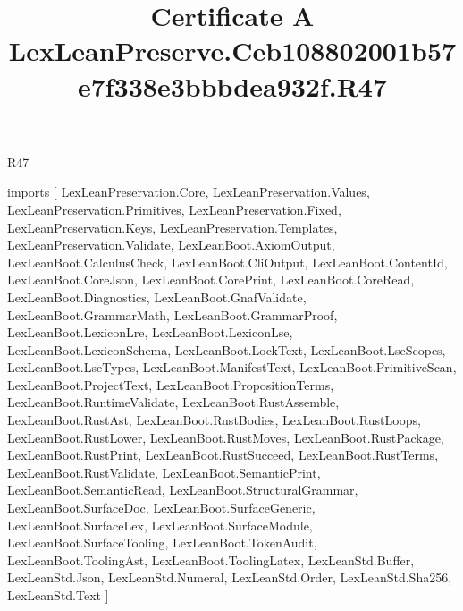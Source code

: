 \begin{lexlean}{R47}
\title{Certificate A LexLeanPreserve.Ceb108802001b57e7f338e3bbbdea932f.R47}
\begin{coremodule}
imports [
  LexLeanPreservation.Core,
  LexLeanPreservation.Values,
  LexLeanPreservation.Primitives,
  LexLeanPreservation.Fixed,
  LexLeanPreservation.Keys,
  LexLeanPreservation.Templates,
  LexLeanPreservation.Validate,
  LexLeanBoot.AxiomOutput,
  LexLeanBoot.CalculusCheck,
  LexLeanBoot.CliOutput,
  LexLeanBoot.ContentId,
  LexLeanBoot.CoreJson,
  LexLeanBoot.CorePrint,
  LexLeanBoot.CoreRead,
  LexLeanBoot.Diagnostics,
  LexLeanBoot.GnafValidate,
  LexLeanBoot.GrammarMath,
  LexLeanBoot.GrammarProof,
  LexLeanBoot.LexiconLre,
  LexLeanBoot.LexiconLse,
  LexLeanBoot.LexiconSchema,
  LexLeanBoot.LockText,
  LexLeanBoot.LseScopes,
  LexLeanBoot.LseTypes,
  LexLeanBoot.ManifestText,
  LexLeanBoot.PrimitiveScan,
  LexLeanBoot.ProjectText,
  LexLeanBoot.PropositionTerms,
  LexLeanBoot.RuntimeValidate,
  LexLeanBoot.RustAssemble,
  LexLeanBoot.RustAst,
  LexLeanBoot.RustBodies,
  LexLeanBoot.RustLoops,
  LexLeanBoot.RustLower,
  LexLeanBoot.RustMoves,
  LexLeanBoot.RustPackage,
  LexLeanBoot.RustPrint,
  LexLeanBoot.RustSucceed,
  LexLeanBoot.RustTerms,
  LexLeanBoot.RustValidate,
  LexLeanBoot.SemanticPrint,
  LexLeanBoot.SemanticRead,
  LexLeanBoot.StructuralGrammar,
  LexLeanBoot.SurfaceDoc,
  LexLeanBoot.SurfaceGeneric,
  LexLeanBoot.SurfaceLex,
  LexLeanBoot.SurfaceModule,
  LexLeanBoot.SurfaceTooling,
  LexLeanBoot.TokenAudit,
  LexLeanBoot.ToolingAst,
  LexLeanBoot.ToolingLatex,
  LexLeanStd.Buffer,
  LexLeanStd.Json,
  LexLeanStd.Numeral,
  LexLeanStd.Order,
  LexLeanStd.Sha256,
  LexLeanStd.Text
]


\end{coremodule}
\end{lexlean}
